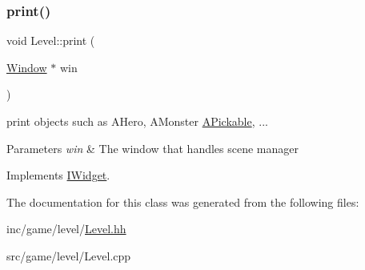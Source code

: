 \subsubsection{\texorpdfstring{print()}{print()}}
{\footnotesize\ttfamily void Level\+::print (\begin{DoxyParamCaption}\item[{\hyperlink{classWindow}{Window} $\ast$}]{win }\end{DoxyParamCaption})\hspace{0.3cm}{\ttfamily [virtual]}}



print objects such as A\+Hero, A\+Monster \hyperlink{classAPickable}{A\+Pickable}, ... 


\begin{DoxyParams}{Parameters}
{\em win} & The window that handles scene manager \\
\hline
\end{DoxyParams}


Implements \hyperlink{classIWidget_a0cfa49a402e9bb31808a715e048ab2f4}{I\+Widget}.



The documentation for this class was generated from the following files\+:\begin{DoxyCompactItemize}
\item 
inc/game/level/\hyperlink{Level_8hh}{Level.\+hh}\item 
src/game/level/Level.\+cpp\end{DoxyCompactItemize}
